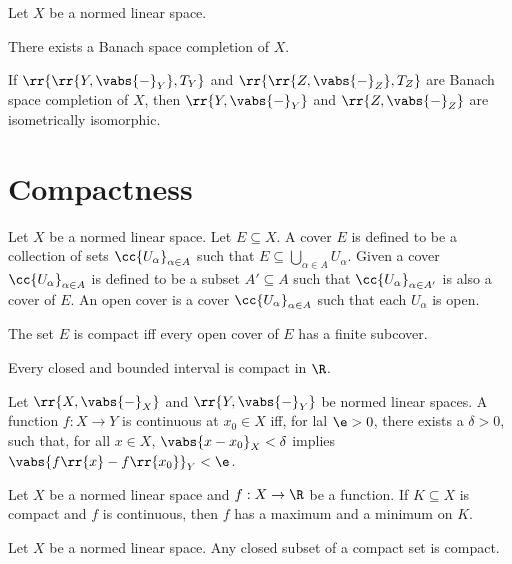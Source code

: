 \documentclass{article}
\begin{document}
\begin{theorem}
  Let $X$ be a normed linear space.

  There exists a Banach space completion of $X$.

  If $\rr{\rr{Y,\vabs{-}_{Y}}, T_Y}$ and $\rr{\rr{Z,\vabs{-}_{Z}}, T_Z}$ are Banach space
  completion of $X$, then $\rr{Y,\vabs{-}_{Y}}$ and $\rr{Z,\vabs{-}_{Z}}$ are isometrically
  isomorphic.
\end{theorem}

\section{Compactness}
\label{sec:compactness}

\begin{definition}
  Let $X$ be a normed linear space. Let $E\subseteq X$. A cover $E$ is defined to be a
  collection of sets $\cc{U_\alpha}_{\alpha\in A}$ such that
  $E\subseteq\bigcup_{\alpha\in A}U_\alpha$. Given a cover $\cc{U_\alpha}_{\alpha\in A}$
  is defined to be a subset $A'\subseteq A$ such that $\cc{U_\alpha}_{\alpha\in A'}$ is also
  a cover of $E$. An open cover is a cover $\cc{U_\alpha}_{\alpha\in A}$ such that each
  $U_\alpha$ is open.

  The set $E$ is compact iff every open cover of $E$ has a finite subcover.
\end{definition}

\begin{theorem}
  Every closed and bounded interval is compact in $\R$.
\end{theorem}

\begin{theorem}
  Let $\rr{X,\vabs{-}_{X}}$ and $\rr{Y,\vabs{-}_{Y}}$ be normed linear spaces. A function
  $f:X\to Y$ is continuous at $x_0\in X$ iff, for lal $\e > 0$, there exists a $\delta > 0$,
  such that, for all $x\in X$, $\vabs{x-x_0}_{X}<\delta$ implies
  $\vabs{f\rr{x}-f\rr{x_0}}_{Y}<\e$.
\end{theorem}

\begin{theorem}
  Let $X$ be a normed linear space and $f:X\to\R$ be a function. If $K\subseteq X$ is compact
  and $f$ is continuous, then $f$ has a maximum and a minimum on $K$.
\end{theorem}

\begin{theorem}
  Let $X$ be a normed linear space. Any closed subset of a compact set is compact.
\end{theorem}
\end{document}
